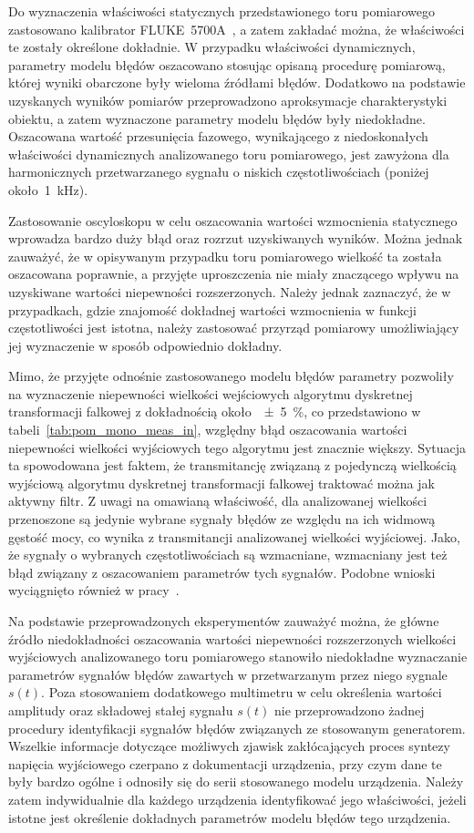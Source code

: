 Do wyznaczenia właściwości statycznych przedstawionego toru pomiarowego zastosowano kalibrator FLUKE~5700A~\cite{fluke_manual}, a zatem zakładać można, że właściwości te zostały określone dokładnie. W przypadku właściwości dynamicznych, parametry modelu błędów oszacowano stosując opisaną procedurę pomiarową, której wyniki obarczone były wieloma źródłami błędów. Dodatkowo na podstawie uzyskanych wyników pomiarów przeprowadzono aproksymacje charakterystyki obiektu, a zatem wyznaczone parametry modelu błędów były niedokładne. Oszacowana wartość przesunięcia fazowego, wynikającego z niedoskonałych właściwości dynamicznych analizowanego toru pomiarowego, jest zawyżona dla harmonicznych przetwarzanego sygnału o niskich częstotliwościach (poniżej około~\qty{1}{kHz}).

Zastosowanie oscyloskopu w celu oszacowania wartości wzmocnienia statycznego wprowadza bardzo duży błąd oraz rozrzut uzyskiwanych wyników. Można jednak zauważyć, że w opisywanym przypadku toru pomiarowego wielkość ta została oszacowana poprawnie, a przyjęte uproszczenia nie miały znaczącego wpływu na uzyskiwane wartości niepewności rozszerzonych. Należy jednak zaznaczyć, że w przypadkach, gdzie znajomość dokładnej wartości wzmocnienia w funkcji częstotliwości jest istotna, należy zastosować przyrząd pomiarowy umożliwiający jej wyznaczenie w sposób odpowiednio dokładny.

Mimo, że przyjęte odnośnie zastosowanego modelu błędów parametry pozwoliły na wyznaczenie niepewności wielkości wejściowych algorytmu dyskretnej transformacji falkowej z dokładnością około~\qty{\pm 5}{\percent}, co przedstawiono w tabeli~\ref{tab:pom_mono_meas_in}, względny błąd oszacowania wartości niepewności wielkości wyjściowych tego algorytmu jest znacznie większy. Sytuacja ta spowodowana jest faktem, że transmitancję związaną z pojedynczą wielkością wyjściową algorytmu dyskretnej transformacji falkowej traktować można jak aktywny filtr. Z uwagi na omawianą właściwość, dla analizowanej wielkości przenoszone są jedynie wybrane sygnały błędów ze względu na ich widmową gęstość mocy, co wynika z transmitancji analizowanej wielkości wyjściowej. Jako, że sygnały o wybranych częstotliwościach są wzmacniane, wzmacniany jest też błąd związany z oszacowaniem parametrów tych sygnałów. Podobne wnioski wyciągnięto również w pracy~\cite{auth_estimation}.

Na podstawie przeprowadzonych eksperymentów zauważyć można, że główne źródło niedokładności oszacowania wartości niepewności rozszerzonych wielkości wyjściowych analizowanego toru pomiarowego stanowiło niedokładne wyznaczanie parametrów sygnałów błędów zawartych w przetwarzanym przez niego sygnale $s(t)$. Poza stosowaniem dodatkowego multimetru w celu określenia wartości amplitudy oraz składowej stałej sygnału $s(t)$ nie przeprowadzono żadnej procedury identyfikacji sygnałów błędów związanych ze stosowanym generatorem. Wszelkie informacje dotyczące możliwych zjawisk zakłócających proces syntezy napięcia wyjściowego czerpano z dokumentacji urządzenia, przy czym dane te były bardzo ogólne i odnosiły się do serii stosowanego modelu urządzenia. Należy zatem indywidualnie dla każdego urządzenia identyfikować jego właściwości, jeżeli istotne jest określenie dokładnych parametrów modelu błędów tego urządzenia.

